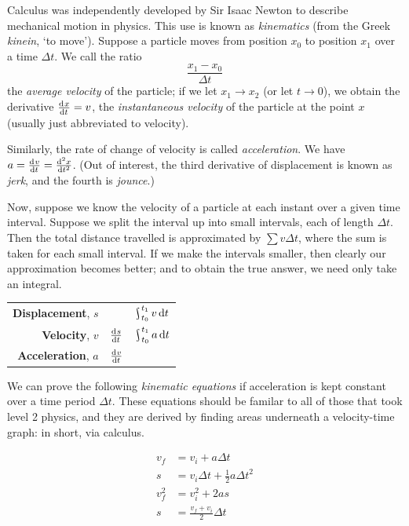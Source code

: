 


Calculus was independently developed by Sir Isaac Newton to describe mechanical motion in physics. This use is known as \textit{kinematics} (from
the Greek \textit{kinein}, `to move'). Suppose a particle moves from position $ x_0 $ to position $ x_1 $ over a time $ \Delta t $. We call the ratio
\begin{displaymath}
  \frac{x_1 - x_0}{\Delta t}
\end{displaymath}
the \textit{average velocity} of the particle; if we let $ x_1 \to x_2 $ (or let $ t \to 0 $), we obtain the derivative $ \od{x}{t} = v $, the
\textit{instantaneous velocity} of the particle at the point $ x $ (usually just abbreviated to velocity).

Similarly, the rate of change of velocity is called \textit{acceleration}. We have $ a = \od{v}{t} = \od[2]{x}{t} $. (Out of interest, the third
derivative of displacement is known as \textit{jerk}, and the fourth is \textit{jounce}.)

Now, suppose we know the velocity of a particle at each instant over a given time interval. Suppose we split the interval up into small intervals,
each of length $ \Delta t $. Then the total distance travelled is approximated by $ \sum v \Delta t $, where the sum is taken for each small interval.
If we make the intervals smaller, then clearly our approximation becomes better; and to obtain the true answer, we need only take an integral.

\begin{center}
  \def\arraystretch{1.5}
  \begin{tabular}{|rcc|}\hline
    \textbf{Displacement}, $ s $ && $\rint_{t_0}^{t_1} v \dif{t} $\\
    \textbf{Velocity}, $ v $ & $ \od{s}{t} $ & $ \rint_{t_0}^{t_1} a \dif{t} $\\
    \textbf{Acceleration}, $ a $ & $ \od{v}{t} $ &\\\hline
  \end{tabular}
\end{center}

We can prove the following \textit{kinematic equations} if acceleration is kept constant over a time period $ \Delta t $. These equations
should be familar to all of those that took level 2 physics, and they are derived by finding areas underneath a velocity-time graph: in
short, via calculus.

\begin{align*}
  v_f &= v_i + a \Delta t\\
  s &= v_i \Delta t + \frac{1}{2} a {\Delta t}^2\\
  v_f^2 &= v_i^2 + 2a s\\
  s &= \frac{v_f + v_i}{2} \Delta t
\end{align*}

